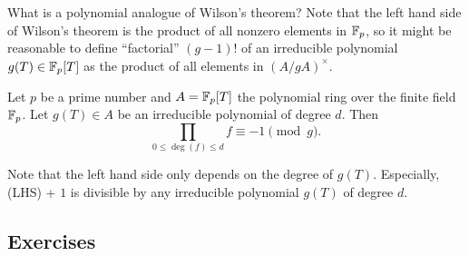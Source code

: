 What is a polynomial analogue of Wilson's theorem?
Note that the left hand side of Wilson's theorem is the product of all nonzero elements in $\mathbb{F}_p$, so it might be reasonable to define ``factorial'' $(g - 1)!$ of an irreducible polynomial $g(T) \in \mathbb{F}_p[T]$ as the product of all elements in $(A / gA)^\times$.

\begin{theorem}
    \label{thm:polynomial_wilson}
    Let $p$ be a prime number and $A = \mathbb{F}_p[T]$ the polynomial ring over the finite field $\mathbb{F}_p$.
    Let $g(T) \in A$ be an irreducible polynomial of degree $d$.
    Then
    \[
        \prod_{0 \le \deg(f) \le d} f \equiv -1 \pmod{g}.
    \]
\end{theorem}

Note that the left hand side only depends on the degree of $g(T)$.
Especially, (LHS) + $1$ is divisible by any irreducible polynomial $g(T)$ of degree $d$.

\subsection*{Exercises}

